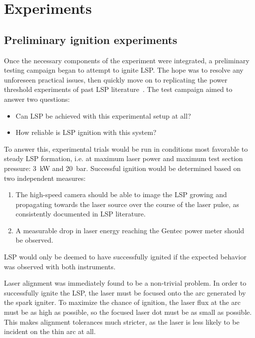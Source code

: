 \chapter{Experiments}
    \section{Preliminary ignition experiments} \label{sec:ignitiontest}
        Once the necessary components of the experiment were integrated, a preliminary testing campaign began to attempt to ignite LSP. The hope was to resolve any unforeseen practical issues, then quickly move on to replicating the power threshold experiments of past LSP literature~\cite{zimakovInteractionNearIRLaser2016,matsuiGeneratingConditionsArgon2019,luCharacteristicDiagnosticsLaserStabilized2022}. The test campaign aimed to answer two questions:
        \begin{itemize}
            \item Can LSP be achieved with this experimental setup at all?
            \item How reliable is LSP ignition with this system?
        \end{itemize}
        To answer this, experimental trials would be run in conditions most favorable to steady LSP formation, i.e. at maximum laser power and maximum test section pressure: \qty{3}{kW} and \qty{20}{bar}. Successful ignition would be determined based on two independent measures:
        \begin{enumerate}
            \item The high-speed camera should be able to image the LSP growing and propagating towards the laser source over the course of the laser pulse, as consistently documented in LSP literature.
            \item A measurable drop in laser energy reaching the Gentec power meter should be observed.
        \end{enumerate}
        LSP would only be deemed to have successfully ignited if the expected behavior was observed with both instruments.

        Laser alignment was immediately found to be a non-trivial problem. In order to successfully ignite the LSP, the laser must be focused onto the arc generated by the spark igniter. To maximize the chance of ignition, the laser flux at the arc must be as high as possible, so the focused laser dot must be as small as possible. This makes alignment tolerances much stricter, as the laser is less likely to be incident on the thin arc at all.

